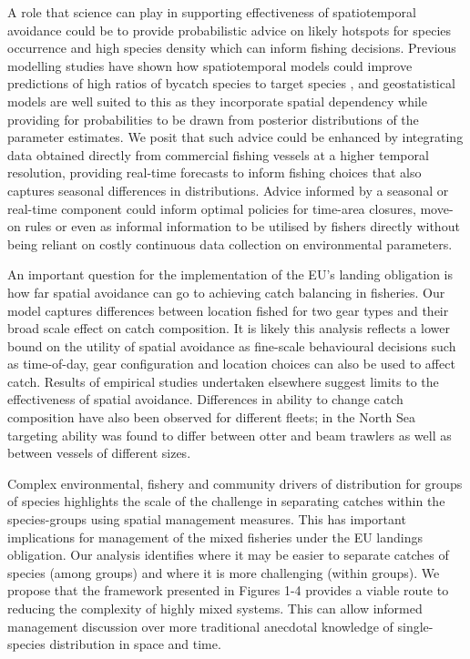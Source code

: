\documentclass{nature}
\begin{document}
A role that science can play in supporting effectiveness of spatiotemporal
avoidance could be to provide probabilistic advice on likely hotspots for
species occurrence and high species density which can inform fishing decisions.
Previous modelling studies have shown how spatiotemporal models could improve
predictions of high ratios of bycatch species to target species \cite{Ward2015,
	Cosandey-Godin2015, Breivik2016}, and geostatistical models are well
suited to this as they incorporate spatial dependency while providing for
probabilities to be drawn from posterior distributions of the parameter
estimates.  We posit that such advice could be enhanced by integrating data
obtained directly from commercial fishing vessels at a higher temporal
resolution, providing real-time forecasts to inform fishing choices that also
captures seasonal differences in distributions.  Advice informed by  a
seasonal or real-time component could inform optimal policies for time-area
closures, move-on rules or even as informal information to be utilised by
fishers directly without being reliant on costly continuous data collection on
environmental parameters.

An important question for the implementation of the EU's landing obligation is
how far spatial avoidance can go to achieving catch balancing in fisheries.
Our model captures differences between location fished for two gear types and
their broad scale effect on catch composition.  It is
likely this analysis reflects a lower bound on the
utility of spatial avoidance as fine-scale behavioural decisions such as
time-of-day, gear configuration and location choices can also be used to affect
catch\cite{Abbott2015, Thorson2016}. Results of empirical studies undertaken
elsewhere\cite{Branch2008, Kuriyama2016} suggest limits to the effectiveness of
spatial avoidance. Differences in ability to change catch composition have also
been observed for different fleets; in the North Sea targeting ability was
found to differ between otter and beam trawlers as well as between vessels of
different sizes\cite{Pascoe2007}.  




Complex environmental, fishery and community drivers of distribution for groups
of species highlights the scale of the challenge in separating catches within
the species-groups using spatial management measures. This has important
implications for management of the mixed fisheries under the EU landings
obligation. Our analysis identifies where it may be easier to separate catches
of species (among groups) and where it is more challenging (within groups). We
propose that the framework presented in Figures 1-4 provides a viable route to
reducing the complexity of highly mixed systems.  This can allow informed
management discussion over more traditional anecdotal knowledge of
single-species distribution in space and time.
\end{document}

